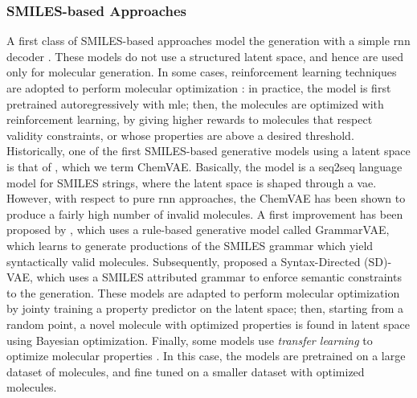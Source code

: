 \subsubsection*{SMILES-based Approaches}
A first class of SMILES-based approaches model the generation with a simple \gls{rnn} decoder \citep{segler2017moleculelibrariesrnn,bjerrum2017molecularrnn}. These models do not use a structured latent space, and hence are used only for molecular generation. In some cases, reinforcement learning techniques are adopted to perform molecular optimization \citep{olivecrona2017deepreinforcementlearningmolecules,neil2018rnnmolecule}: in practice, the model is first pretrained autoregressively with \gls{mle}; then, the molecules are optimized with reinforcement learning, by giving higher rewards to molecules that respect validity constraints, or whose properties are above a desired threshold. Historically, one of the first SMILES-based generative models using a latent space is that of \citet{gomez2018vaemolecule}, which we term ChemVAE. Basically, the model is a seq2seq language model for SMILES strings, where the latent space is shaped through a \gls{vae}. However, with respect to pure \gls{rnn} approaches, the ChemVAE has been shown to produce a fairly high number of invalid molecules. A first improvement has been proposed by \citet{kusner2017grammarvae}, which uses a rule-based generative model called GrammarVAE, which learns to generate productions of the SMILES grammar which yield syntactically valid molecules. Subsequently, \citet{dai2018sdvae} proposed a Syntax-Directed (SD)-VAE, which uses a SMILES attributed grammar to enforce semantic constraints to the generation. These models are adapted to perform molecular optimization by jointy training a property predictor on the latent space; then, starting from a random point, a novel molecule with optimized properties is found in latent space using Bayesian optimization. Finally, some models use \emph{transfer learning} to optimize molecular properties \citep{maragakis2020desmiles,grisoni2018transferlearningmolecules}. In this case, the models are pretrained on a large dataset of molecules, and fine tuned on a smaller dataset with optimized molecules.

